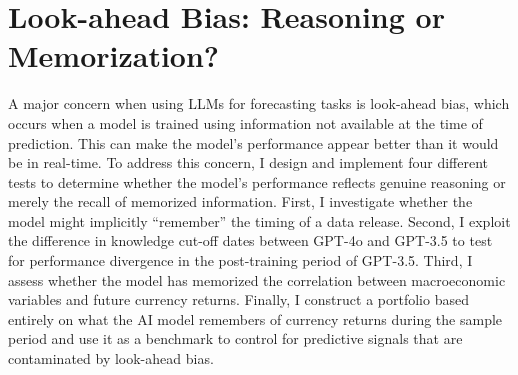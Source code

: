 \documentclass[12pt,oneside,letter]{article}
\begin{document}
		\section{Look-ahead Bias: Reasoning or Memorization?} \label{sec:Look-ahead Bias; Reasoning or Memorization}
		A major concern when using LLMs for forecasting tasks is look-ahead bias, which occurs when a model is trained using information not available at the time of prediction. This can make the model’s performance appear better than it would be in real-time. To address this concern, I design and implement four different tests to determine whether the model’s performance reflects genuine reasoning or merely the recall of memorized information. First, I investigate whether the model might implicitly “remember” the timing of a data release. Second, I exploit the difference in knowledge cut-off dates between GPT-4o and GPT-3.5 to test for performance divergence in the post-training period of GPT-3.5. Third, I assess whether the model has memorized the correlation between macroeconomic variables and future currency returns. Finally, I construct a portfolio based entirely on what the AI model remembers of currency returns during the sample period and use it as a benchmark to control for predictive signals that are contaminated by look-ahead bias.
\end{document}
